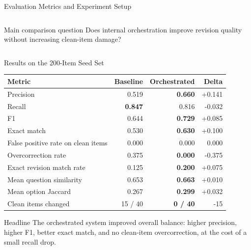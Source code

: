 \documentclass[aspectratio=169]{beamer}
\begin{document}
\begin{frame}[shrink=6]{Evaluation Metrics and Experiment Setup}
\begin{columns}[T,onlytextwidth]
\begin{column}{0.44\textwidth}
      \vspace{0.06cm}

      \begin{alertblock}{Main comparison question}
        Does internal orchestration improve revision quality without increasing clean-item damage?
      \end{alertblock}
    \end{column}
  \end{columns}
\end{frame}

\begin{frame}{Results on the 200-Item Seed Set}
  \scriptsize
  \centering
  \begin{table}
    \begin{tabularx}{0.92\textwidth}{Yrrr}
      \toprule
      Metric & Baseline & Orchestrated & Delta \\
      \midrule
      Precision & 0.519 & \textbf{0.660} & +0.141 \\
      Recall & \textbf{0.847} & 0.816 & -0.032 \\
      F1 & 0.644 & \textbf{0.729} & +0.085 \\
      Exact match & 0.530 & \textbf{0.630} & +0.100 \\
      False positive rate on clean items & 0.000 & 0.000 & 0.000 \\
      Overcorrection rate & 0.375 & \textbf{0.000} & -0.375 \\
      Exact revision match rate & 0.125 & \textbf{0.200} & +0.075 \\
      Mean question similarity & 0.653 & \textbf{0.663} & +0.010 \\
      Mean option Jaccard & 0.267 & \textbf{0.299} & +0.032 \\
      Clean items changed & 15 / 40 & \textbf{0 / 40} & -15 \\
      \bottomrule
    \end{tabularx}
  \end{table}

  \vspace{0.12cm}

  \begin{block}{Headline}
    The orchestrated system improved overall balance: higher precision, higher F1, better exact match, and no clean-item overcorrection, at the cost of a small recall drop.
  \end{block}
\end{frame}
\end{document}
